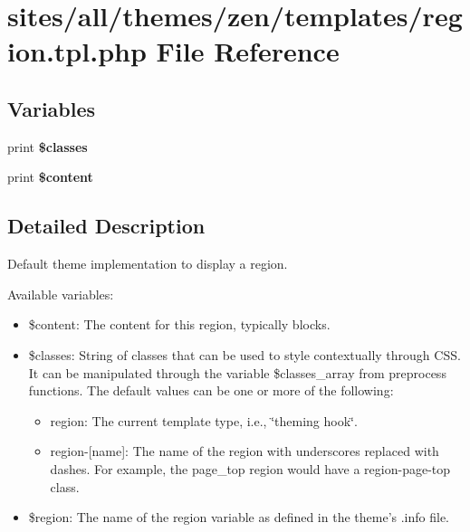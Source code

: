 \hypertarget{region_8tpl_8php}{
\section{sites/all/themes/zen/templates/region.tpl.php File Reference}
\label{region_8tpl_8php}
}
\subsection*{Variables}
\begin{CompactItemize}
\item 
\hypertarget{region_8tpl_8php_6d48ecbdbc70ca1812e665169b5fa1e2}{
print \textbf{\$classes}}
\label{region_8tpl_8php_6d48ecbdbc70ca1812e665169b5fa1e2}

\item 
\hypertarget{region_8tpl_8php_b7b7210f43aa78e34f0b202de894a74c}{
print \textbf{\$content}}
\label{region_8tpl_8php_b7b7210f43aa78e34f0b202de894a74c}

\end{CompactItemize}


\subsection{Detailed Description}
Default theme implementation to display a region.

Available variables:\begin{itemize}
\item \$content: The content for this region, typically blocks.\item \$classes: String of classes that can be used to style contextually through CSS. It can be manipulated through the variable \$classes\_\-array from preprocess functions. The default values can be one or more of the following:\begin{itemize}
\item region: The current template type, i.e., \char`\"{}theming hook\char`\"{}.\item region-\mbox{[}name\mbox{]}: The name of the region with underscores replaced with dashes. For example, the page\_\-top region would have a region-page-top class.\end{itemize}
\item \$region: The name of the region variable as defined in the theme's .info file.\end{itemize}


